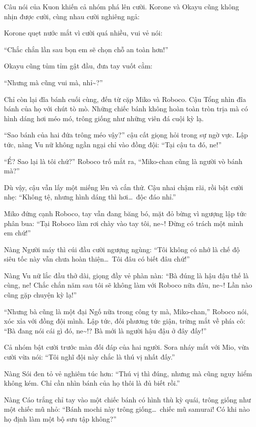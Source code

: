 \documentclass[../main.tex]{subfiles}
\begin{document}
Câu nói của Kuon khiến cả nhóm phá lên cười. Korone và Okayu cũng không nhịn được cười, cùng nhau cười nghiêng ngả:

Korone quẹt nước mắt vì cười quá nhiều, vui vẻ nói:

``Chắc chắn lần sau bọn em sẽ chọn chỗ an toàn hơn!''

Okayu cũng tủm tỉm gật đầu, đưa tay vuốt cằm:

``Nhưng mà cũng vui mà, nhỉ\~{}?''

\ct

Chỉ còn lại đĩa bánh cuối cùng, đến từ cặp Miko và Roboco. Cậu Tổng nhìn đĩa bánh của họ với chút tò mò. Những chiếc bánh không hoàn toàn tròn trịa mà có hình dáng hơi méo mó, trông giống như những viên đá cuội kỳ lạ.

``Sao bánh của hai đứa trông méo vậy?'' cậu cất giọng hỏi trong sự ngờ vực. Lập tức, nàng Vu nữ không ngần ngại chỉ vào đồng đội: ``Tại cậu ta đó, ne!''

``Ể? Sao lại là tôi chứ?'' Roboco trố mắt ra, ``Miko-chan cũng là người vò bánh mà?''

Dù vậy, cậu vẫn lấy một miếng lên và cắn thử. Cậu nhai chậm rãi, rồi bật cười nhẹ: ``Không tệ, nhưng hình dáng thì hơi\dots\ độc đáo nhỉ.''

Miko đứng cạnh Roboco, tay vẫn đang băng bó, mặt đỏ bừng vì ngượng lập tức phân bua: ``Tại Roboco làm rơi chày vào tay tôi, ne\~{}! Đừng có trách một mình em chứ!''

Nàng Người máy thì cúi đầu cười ngượng ngùng: ``Tôi không có nhớ là chế độ siêu tốc này vẫn chưa hoàn thiện\dots\ Tôi đâu có biết đâu chứ!''

Nàng Vu nữ lắc đầu thở dài, giọng đầy vẻ phàn nàn: ``Bà đúng là hậu đậu thế là cùng, ne! Chắc chắn năm sau tôi sẽ không làm với Roboco nữa đâu, ne\~{}! Lần nào cũng gặp chuyện kỳ lạ!''


``Nhưng bà cũng là một đại Ngố nữa trong công ty mà, Miko-chan,'' Roboco nói, xóc xỉa với đồng đội mình. Lập tức, đối phương tức giận, trừng mắt về phía cô: ``Bà đang nói cái gì đó, ne\~{}!? Bà mới là người hậu đậu ở đây đấy!''

Cả nhóm bật cười trước màn đối đáp của hai người. Sora nháy mắt với Mio, vừa cười vừa nói: ``Tôi nghĩ đội này chắc là thú vị nhất đấy.''

Nàng Sói đen tỏ vẻ nghiêm túc hơn: ``Thú vị thì đúng, nhưng mà cũng nguy hiểm không kém. Chỉ cần nhìn bánh của họ thôi là đủ biết rồi.''

Nàng Cáo trắng chỉ tay vào một chiếc bánh có hình thù kỳ quái, trông giống như một chiếc mũ nhỏ: ``Bánh mochi này trông giống\dots\ chiếc mũ samurai! Có khi nào họ định làm một bộ sưu tập không?''
\end{document}
